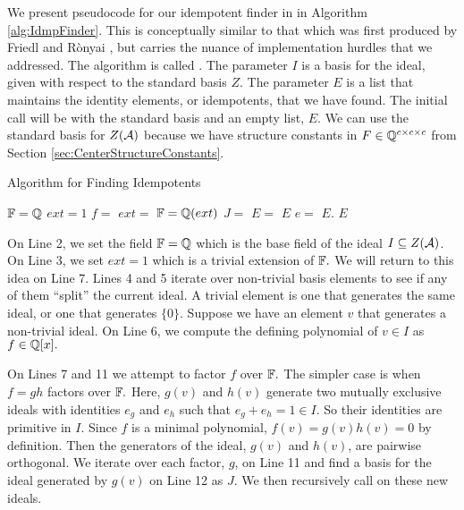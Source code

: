 \documentclass[../thesis.tex]{subfiles}
\begin{document}
We present pseudocode for our idempotent finder in in Algorithm \ref{alg:IdmpFinder}. This is conceptually similar to that which was first produced by Friedl and R\`onyai \cite{PolyTimeSolns}, but carries the nuance of implementation hurdles that we addressed. The algorithm is called . The parameter $I$ is a basis for the ideal, given with respect to the standard basis $Z.$ The parameter $E$ is a list that maintains the identity elements, or idempotents, that we have found. The initial call will be  with the standard basis and an empty list, $E$. We can use the standard basis for $Z(\mathcal{A})$ because we have structure constants in $F\in\mathbb{Q}^{c\times c\times c}$ from Section \ref{sec:CenterStructureConstants}.

\begin{algorithm}[t]
\caption{Algorithm for Finding Idempotents}\label{alg:IdmpFinder}
\begin{algorithmic}[1]
\State $\mathbb{F} = \mathbb{Q}$
\State $ext = 1$
        \State $f = $
            \State $ext =$
            \State $\mathbb{F} = \mathbb{Q}(ext)$
        \Else 
                \State $J = $
                \State $E = $
            \EndFor
        \EndIf
        \State \Return $E$
    \EndIf
\EndFor
\State $e =$
\State $E.$
\State \Return $E$
\EndFunction
\end{algorithmic}
\end{algorithm}

On Line 2, we set the field $\mathbb{F} = \mathbb{Q}$ which is the base field of the ideal $I\subseteq Z(\mathcal{A})$. On Line 3, we set $ext = 1$ which is a trivial extension of $\mathbb{F}.$ We will return to this idea on Line 7. Lines 4 and 5 iterate over non-trivial basis elements to see if any of them ``split'' the current ideal. A trivial element is one that generates the same ideal, or one that generates $\{0\}$. Suppose we have an element $v$ that generates a non-trivial ideal. On Line 6, we compute the defining polynomial of $v\in I$ as $f\in\mathbb{Q}[x].$

On Lines 7 and 11 we attempt to factor $f$ over $\mathbb{F}.$ The simpler case is when $f=gh$ factors over $\mathbb{F}.$ Here, $g(v)$ and $h(v)$ generate two mutually exclusive ideals with identities $e_g$ and $e_h$ such that $e_g+e_h = 1\in I$. So their identities are primitive in $I.$ Since $f$ is a minimal polynomial, $f(v) = g(v)h(v) = 0$ by definition. Then the generators of the ideal, $g(v)$ and $h(v)$, are pairwise orthogonal. We iterate over each factor, $g$, on Line 11 and find a basis for the ideal generated by $g(v)$ on Line 12 as $J.$ We then recursively call  on these new ideals.
\end{document}
